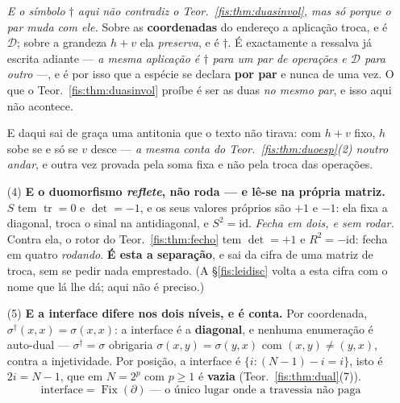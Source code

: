 \documentclass[livro.tex]{subfiles}
\begin{document}
\begin{teorema}
\begin{enumerate}
\smallskip\noindent\emph{E o símbolo $\dagger$ aqui não contradiz o
Teor.~\ref{fis:thm:duasinvol}, mas só porque o par muda com ele.} Sobre as
\textbf{coordenadas} do endereço a aplicação troca, e é $\mathcal{D}$; sobre a
grandeza $h+v$ ela \emph{preserva}, e é $\dagger$. É exactamente a ressalva já
escrita adiante --- \emph{a mesma aplicação é $\dagger$ para um par de operações e
$\mathcal{D}$ para outro} ---, e é por isso que a espécie se declara \textbf{por
par} e nunca de uma vez. O que o Teor.~\ref{fis:thm:duasinvol} proíbe é ser as
duas \emph{no mesmo par}, e isso aqui não acontece.

\smallskip\noindent E daqui sai de graça uma antitonia que o texto não tirava:
com $h+v$ fixo, $h$ sobe se e só se $v$ desce --- \emph{a mesma conta do
Teor.~\ref{fis:thm:duoesp}(2) noutro andar}, e outra vez provada pela soma fixa e
não pela troca das operações.
\item[(4)] \textbf{E o duomorfismo \emph{reflete}, não roda --- e lê-se na
própria matriz.} $S$ tem $\operatorname{tr}=0$ e $\det=-1$, e os seus valores
próprios são $+1$ e $-1$: ela fixa a diagonal, troca o sinal na antidiagonal, e
$S^{2}=\mathrm{id}$. \emph{Fecha em dois, e sem rodar.} Contra ela, o rotor do
Teor.~\ref{fis:thm:fecho} tem $\det=+1$ e $R^{2}=-\mathrm{id}$: fecha em quatro
\emph{rodando}. \textbf{É esta a separação}, e sai da cifra de uma matriz de
troca, sem se pedir nada emprestado. (A §\ref{fis:leidisc} volta a esta cifra
com o nome que lá lhe dá; aqui não é preciso.)
\item[(5)] \textbf{E a interface difere nos dois níveis, e é conta.} Por
coordenada, $\sigma^{\dagger}(x,x)=\sigma(x,x)$: a interface é a \textbf{diagonal},
e nenhuma enumeração é auto-dual --- $\sigma^{\dagger}=\sigma$ obrigaria
$\sigma(x,y)=\sigma(y,x)$ com $(x,y)\neq(y,x)$, contra a injetividade. Por
posição, a interface é $\{i: (N-1)-i=i\}$, isto é $2i=N-1$, que em $N=2^{p}$ com
$p\ge1$ é \textbf{vazia} (Teor.~\ref{fis:thm:dual}(7)).
\[
\boxed{\;\text{interface}=\operatorname{Fix}(\partial)\;\text{---\ o único lugar onde a travessia não paga}\;}
\]
\end{enumerate}
\end{teorema}
\end{document}
